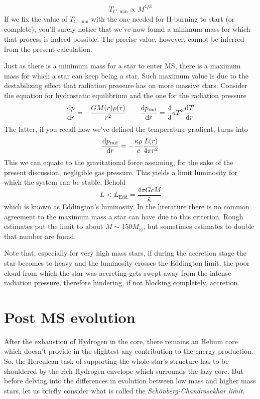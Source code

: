 \begin{equation*}
    T_{C,\,\text{min}} \propto M^{4/3}
\end{equation*}
If we fix the value of $T_{C,\,\text{min}}$ with the one needed for H-burning to start (or complete), you'll surely notice that we've now found a minimum mass for which that process is indeed possible. The precise value, however, cannot be inferred from the present calculation.
\par Just as there is a minimum mass for a star to enter MS, there is a maximum mass for which a star can keep being a star. Such maximum value is due to the destabilizing effect that radiation pressure has on more massive stars. Consider the equation for hydrostatic equilibrium and the one for the radiation pressure
\begin{equation*}
    \frac{\text{d}p}{\text{d}r} = -\frac{GM(r)\rho(r)}{r^{2}} \quad \quad  \frac{\text{d}p_{\text{rad}}}{\text{d}r} = \frac{4}{3}aT^{3}\frac{\text{d}T}{\text{d}r}
\end{equation*}
The latter, if you recall how we've defined the temperature gradient, turns into
\begin{equation*}
    \frac{\text{d}p_{\text{rad}}}{\text{d}r} = -\frac{\bar{\kappa}\rho}{c}\frac{L(r)}{4\pi r^{2}}
\end{equation*}
This we can equate to the gravitational force assuming, for the sake of the present discussion, negligible gas pressure. This yields a limit luminosity for which the system can be stable. Behold
\begin{equation}
    L < L_{\text{Edd}} = \frac{4\pi Gc M}{\bar{\kappa}}
    \label{eq:eddington_lum}
\end{equation}
which is known as Eddington's luminosity. In the literature there is no common agreement to the maximum mass a star can have due to this criterion. Rough estimates put the limit to about $M \sim 150M_{\odot}$, but sometimes estimates to double that number are found.
\par Note that, especially for very high mass stars, if during the accretion stage the star becomes to heavy and the luminosity crosses the Eddington limit, the poor cloud from which the star was accreting gets swept away from the intense radiation pressure, therefore hindering, if not blocking completely, accretion.

\section{Post MS evolution}

After the exhaustion of Hydrogen in the core, there remains an Helium core which doesn't provide in the slightest any contribution to the energy production. So, the Herculean task of supporting the whole star's structure has to be shouldered by the rich Hydrogen envelope which surrounds the lazy core. But before delving into the differences in evolution between low mass and higher mass stars, let us briefly consider what is called the \emph{Schönberg-Chandrasekhar limit}.

